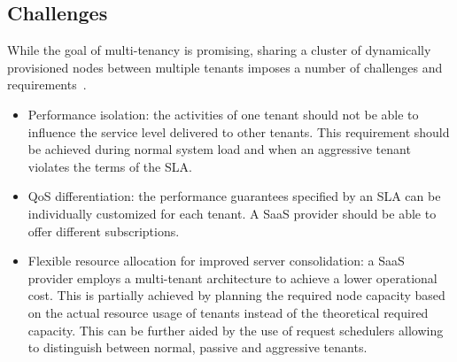 \subsection{Challenges}
While the goal of multi-tenancy is promising, sharing a cluster of dynamically provisioned nodes between multiple tenants imposes a number of challenges and requirements~\cite{TruyenEddy2016Taca}. 
\begin{itemize}
\item Performance isolation: the activities of one tenant should not be able to influence the service level delivered to other tenants. This requirement should be achieved during normal system load and when an aggressive tenant violates the terms of the SLA. 
\item QoS differentiation: the performance guarantees specified by an SLA can be individually customized for each tenant. A SaaS provider should be able to offer different subscriptions.
\item Flexible resource allocation for improved server consolidation: a SaaS provider employs a multi-tenant architecture to achieve a lower operational cost. This is partially achieved by planning the required node capacity based on the actual resource usage of tenants instead of the theoretical required capacity.  This can be further aided by the use of request schedulers allowing to distinguish between normal, passive and aggressive tenants. 
\end{itemize}
